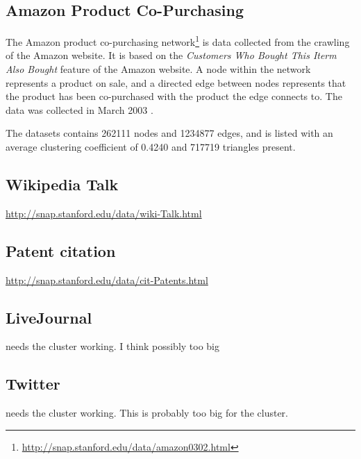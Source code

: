 \subsection{Amazon Product Co-Purchasing}
The Amazon product co-purchasing network\footnote{\url{http://snap.stanford.edu/data/amazon0302.html}} is data collected from the crawling of the Amazon website. It is based on the \emph{Customers Who Bought This Iterm Also Bought} feature of the Amazon website. A node within the network represents a product on sale, and a directed edge between nodes represents that the product has been co-purchased with the product the edge connects to. The data was collected in March 2003 \cite{snap}.

The datasets contains 262111 nodes and 1234877 edges, and is listed with an average clustering coefficient of 0.4240 and 717719 triangles present.

\subsection{Wikipedia Talk}
\url{http://snap.stanford.edu/data/wiki-Talk.html}

\subsection{Patent citation}
\url{http://snap.stanford.edu/data/cit-Patents.html}

\subsection{LiveJournal}
needs the cluster working. I think possibly too big

\subsection{Twitter}
needs the cluster working. This is probably too big for the cluster.








